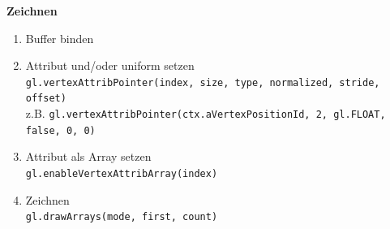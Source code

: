 \textbf{Zeichnen}

\begin{enumerate}
    \item Buffer binden
    \item Attribut und/oder uniform setzen \\
    \texttt{gl.vertexAttribPointer(index, size, type, normalized, stride, offset)} \\
    z.B. \texttt{gl.vertexAttribPointer(ctx.aVertexPositionId, 2, gl.FLOAT, false, 0, 0)}
    
    \item Attribut als Array setzen \\
    \texttt{gl.enableVertexAttribArray(index)}
    
    \item Zeichnen \\
    \texttt{gl.drawArrays(mode, first, count)}
\end{enumerate}
